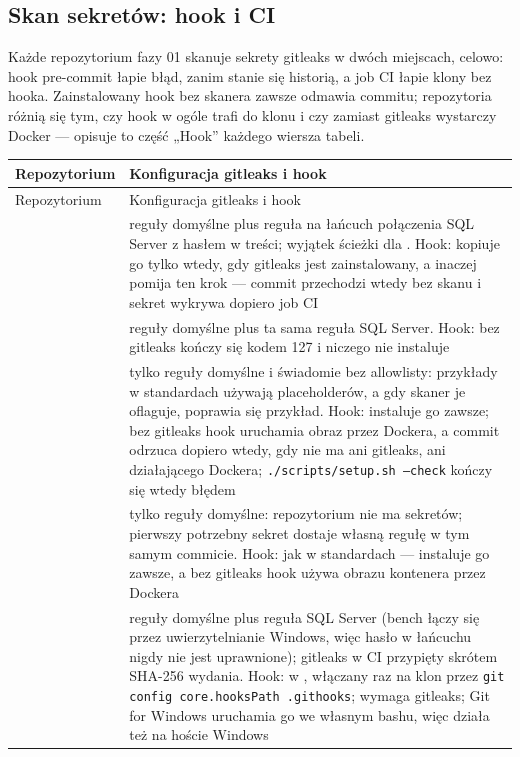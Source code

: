 \subsection{Skan sekretów: hook i CI}\label{sec:bezpieczenstwo-skan}

Każde repozytorium fazy 01 skanuje sekrety gitleaks w dwóch miejscach, celowo: hook
pre-commit łapie błąd, zanim stanie się historią, a job CI łapie klony bez hooka.
Zainstalowany hook bez skanera zawsze odmawia commitu; repozytoria różnią się tym, czy hook
w ogóle trafi do klonu i czy zamiast gitleaks wystarczy Docker --- opisuje to część „Hook”
każdego wiersza tabeli.

\begin{xltabular}{\linewidth}{@{}>{\raggedright\arraybackslash}p{4.6cm} >{\raggedright\arraybackslash}X@{}}
\toprule
Repozytorium & Konfiguracja gitleaks i hook \\
\midrule
\endfirsthead
\toprule
Repozytorium & Konfiguracja gitleaks i hook \\
\midrule
\endhead
{} & reguły domyślne plus reguła na łańcuch połączenia SQL Server z hasłem w treści; wyjątek ścieżki dla . Hook:  kopiuje go tylko wtedy, gdy gitleaks jest zainstalowany, a inaczej pomija ten krok --- commit przechodzi wtedy bez skanu i sekret wykrywa dopiero job CI \\
 & reguły domyślne plus ta sama reguła SQL Server. Hook:  bez gitleaks kończy się kodem 127 i niczego nie instaluje \\
 & tylko reguły domyślne i świadomie bez allowlisty: przykłady w standardach używają placeholderów, a gdy skaner je oflaguje, poprawia się przykład. Hook:  instaluje go zawsze; bez gitleaks hook uruchamia obraz  przez Dockera, a commit odrzuca dopiero wtedy, gdy nie ma ani gitleaks, ani działającego Dockera; \texttt{./scripts/setup.sh --check} kończy się wtedy błędem \\
 & tylko reguły domyślne: repozytorium nie ma sekretów; pierwszy potrzebny sekret dostaje własną regułę w tym samym commicie. Hook: jak w standardach ---  instaluje go zawsze, a bez gitleaks hook używa obrazu kontenera przez Dockera \\
 & reguły domyślne plus reguła SQL Server (bench łączy się przez uwierzytelnianie Windows, więc hasło w łańcuchu nigdy nie jest uprawnione); gitleaks w CI przypięty skrótem SHA-256 wydania. Hook: w , włączany raz na klon przez \texttt{git config core.hooksPath .githooks}; wymaga gitleaks; Git for Windows uruchamia go we własnym bashu, więc działa też na hoście Windows \\
\bottomrule
\end{xltabular}

